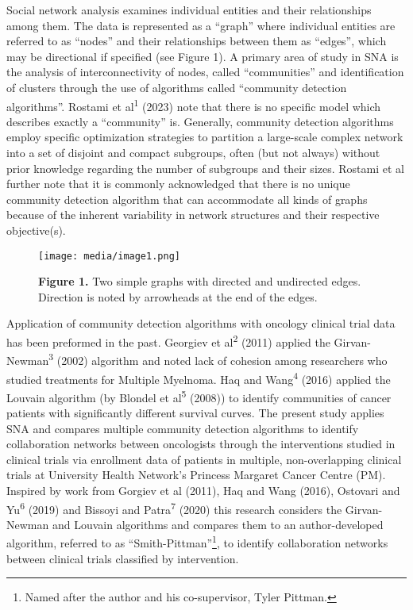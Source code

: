 Social network analysis examines individual entities and their
relationships among them. The data is represented as a ``graph'' where
individual entities are referred to as ``nodes'' and their relationships
between them as ``edges'', which may be directional if specified (see
Figure 1). A primary area of study in SNA is the analysis of
interconnectivity of nodes, called ``communities'' and identification of
clusters through the use of algorithms called ``community detection
algorithms''. Rostami et al\textsuperscript{1} (2023) note that there is
no specific model which describes exactly a ``community'' is. Generally,
community detection algorithms employ specific optimization strategies
to partition a large-scale complex network into a set of disjoint and
compact subgroups, often (but not always) without prior knowledge
regarding the number of subgroups and their sizes. Rostami et al further
note that it is commonly acknowledged that there is no unique community
detection algorithm that can accommodate all kinds of graphs because of
the inherent variability in network structures and their respective
objective(s).

\begin{figure}
\centering
\texttt{[image: media/image1.png]}
\caption{\textbf{Figure 1.} Two simple graphs with directed and
undirected edges. Direction is noted by arrowheads at the end of the
edges.}
\end{figure}

Application of community detection algorithms with oncology clinical
trial data has been preformed in the past. Georgiev et
al\textsuperscript{2} (2011) applied the
Girvan-Newman\textsuperscript{3} (2002) algorithm and noted lack of
cohesion among researchers who studied treatments for Multiple Myelnoma.
Haq and Wang\textsuperscript{4} (2016) applied the Louvain algorithm (by
Blondel et al\textsuperscript{5} (2008)) to identify communities of
cancer patients with significantly different survival curves. The
present study applies SNA and compares multiple community detection
algorithms to identify collaboration networks between oncologists
through the interventions studied in clinical trials via enrollment data
of patients in multiple, non-overlapping clinical trials at University
Health Network's Princess Margaret Cancer Centre (PM). Inspired by work
from Gorgiev et al (2011), Haq and Wang (2016), Ostovari and
Yu\textsuperscript{6} (2019) and Bissoyi and Patra\textsuperscript{7}
(2020) this research considers the Girvan-Newman and Louvain algorithms
and compares them to an author-developed algorithm, referred to as
``Smith-Pittman''\footnote{Named after the author and his co-supervisor,
  Tyler Pittman.}, to identify collaboration networks between clinical
trials classified by intervention.

